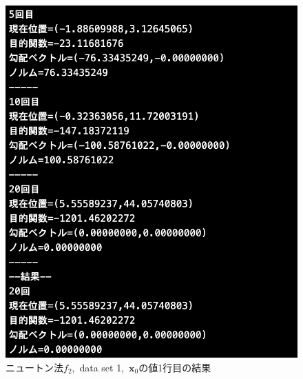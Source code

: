 \documentclass[12pt]{jarticle}
\begin{document}
\begin{figure}[h]
\begin{minipage}{0.5\hsize}
    \end{minipage}
    \begin{minipage}{0.5\hsize}
        \begin{center}
            \includegraphics[scale=0.2]{kadai1_2n_out1_1_2.png}
        \end{center}
    \end{minipage}
    \caption{ニュートン法$f_2$,\ data set 1,\ $\boldsymbol{x}_0$の値1行目の結果}
\end{figure}
\end{document}
